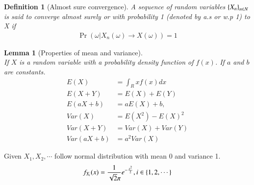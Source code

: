 \documentclass[journal,12pt,twocolumn]{IEEEtran}
\newtheorem{definition}{Definition}[section]
\newtheorem{lemma}[theorem]{Lemma}
\begin{document}
\begin{definition}[Almost sure convergence]
A sequence of random variables $\left\{X_n\right\}_{n\in N}$ is said to converge almost surely or with probability 1 (denoted by a.s or w.p 1) to X if \label{with prob 1}
\begin{align}
    \Pr(\omega |X_n(\omega) \to X(\omega))=1
\end{align}
\end{definition}

\begin{lemma}[Properties of mean and variance]\\
If $X$ is a random variable with a probability density function of $f(x)$. If $a$ and $b$ are constants.
\begin{align}
    \label{1}
    E(X)&=\int_R xf(x)dx\\ 
    \label{2}
    E(X+Y)&=E(X)+E(Y)\\    
    \label{3}
    E(aX+b)&=aE(X)+b, \\   
    \label{4}
    Var(X)&=E(X^2)-{E(X)}^2\\  
    \label{5}
    Var(X+Y)&=Var(X)+Var(Y)\\  
    \label{6}
    Var(aX+b)&=a^2 Var(X)
    
\end{align}
\end{lemma}




Given $X_1,X_2, \cdots$ follow normal distribution with mean 0 and variance 1.
\begin{align}
    f_{X_i}(x)=\frac{1}{\sqrt{2}\pi}e^{-\frac{x^2}{2}} ,i \in \left\{1,2,\cdots\right\}
\end{align}
\end{document}
